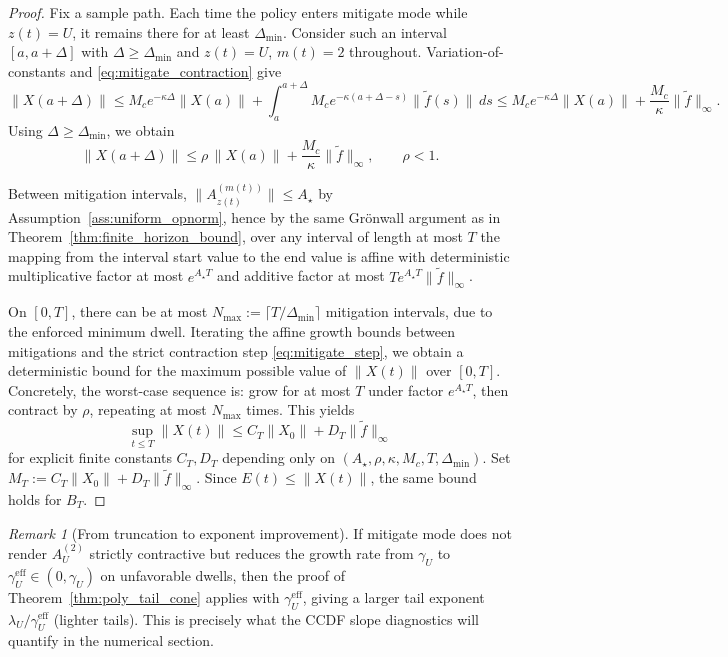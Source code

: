 \documentclass[12pt,a4paper]{article}
\theoremstyle{definition}
\theoremstyle{remark}
\newtheorem{remark}{Remark}
\begin{document}
\begin{proof}
	Fix a sample path. Each time the policy enters mitigate mode while $z(t)=U$, it remains there for at least $\Delta_{\min}$.
	Consider such an interval $[a,a+\Delta]$ with $\Delta\ge \Delta_{\min}$ and $z(t)=U$, $m(t)=2$ throughout.
	Variation-of-constants and \eqref{eq:mitigate_contraction} give
	\[
	\|X(a+\Delta)\|
	\le
	M_c e^{-\kappa \Delta}\|X(a)\|
	+
	\int_a^{a+\Delta} M_c e^{-\kappa(a+\Delta-s)}\|\widetilde f(s)\|\,ds
	\le
	M_c e^{-\kappa \Delta}\|X(a)\|
	+
	\frac{M_c}{\kappa}\|\widetilde f\|_\infty.
	\]
	Using $\Delta\ge \Delta_{\min}$, we obtain
	\begin{equation}\label{eq:mitigate_step}
		\|X(a+\Delta)\| \le \rho\,\|X(a)\|+\frac{M_c}{\kappa}\|\widetilde f\|_\infty,
		\qquad \rho<1.
	\end{equation}
	
	Between mitigation intervals, $\|A_{z(t)}^{(m(t))}\|\le A_\star$ by Assumption~\ref{ass:uniform_opnorm}, hence by the same Gr\"onwall argument
	as in Theorem~\ref{thm:finite_horizon_bound}, over any interval of length at most $T$ the mapping from the interval start value to the end value
	is affine with deterministic multiplicative factor at most $e^{A_\star T}$ and additive factor at most $T e^{A_\star T}\|\widetilde f\|_\infty$.
	
	On $[0,T]$, there can be at most $N_{\max}:=\lceil T/\Delta_{\min}\rceil$ mitigation intervals, due to the enforced minimum dwell.
	Iterating the affine growth bounds between mitigations and the strict contraction step \eqref{eq:mitigate_step}, we obtain a deterministic bound
	for the maximum possible value of $\|X(t)\|$ over $[0,T]$. Concretely, the worst-case sequence is:
	grow for at most $T$ under factor $e^{A_\star T}$, then contract by $\rho$, repeating at most $N_{\max}$ times. This yields
	\[
	\sup_{t\le T}\|X(t)\|
	\le
	C_T\|X_0\| + D_T\|\widetilde f\|_\infty
	\]
	for explicit finite constants $C_T,D_T$ depending only on $(A_\star,\rho,\kappa,M_c,T,\Delta_{\min})$.
	Set $M_T:=C_T\|X_0\|+D_T\|\widetilde f\|_\infty$. Since $E(t)\le\|X(t)\|$, the same bound holds for $B_T$.
\end{proof}

\begin{remark}[From truncation to exponent improvement]
	If mitigate mode does not render $A_U^{(2)}$ strictly contractive but reduces the growth rate from $\gamma_U$ to
	$\gamma_U^{\mathrm{eff}}\in(0,\gamma_U)$ on unfavorable dwells, then the proof of Theorem~\ref{thm:poly_tail_cone} applies with $\gamma_U^{\mathrm{eff}}$,
	giving a larger tail exponent $\lambda_U/\gamma_U^{\mathrm{eff}}$ (lighter tails). This is precisely what the CCDF slope
	diagnostics will quantify in the numerical section.
\end{remark}
\end{document}
